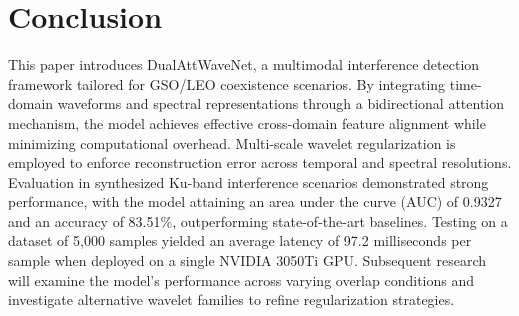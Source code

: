 \documentclass[conference]{IEEEtran}
\begin{document}


\section{Conclusion}

This paper introduces DualAttWaveNet, a multimodal interference detection framework tailored for GSO/LEO coexistence scenarios. By integrating time-domain waveforms and spectral representations through a bidirectional attention mechanism, the model achieves effective cross-domain feature alignment while minimizing computational overhead. Multi-scale wavelet regularization is employed to enforce reconstruction error across temporal and spectral resolutions. Evaluation in synthesized Ku-band interference scenarios demonstrated strong performance, with the model attaining an area under the curve (AUC) of 0.9327 and an accuracy of 83.51\%, outperforming state-of-the-art baselines. Testing on a dataset of 5,000 samples yielded an average latency of 97.2 milliseconds per sample when deployed on a single NVIDIA 3050Ti GPU. Subsequent research will examine the model’s performance across varying overlap conditions and investigate alternative wavelet families to refine regularization strategies.



\end{document}
